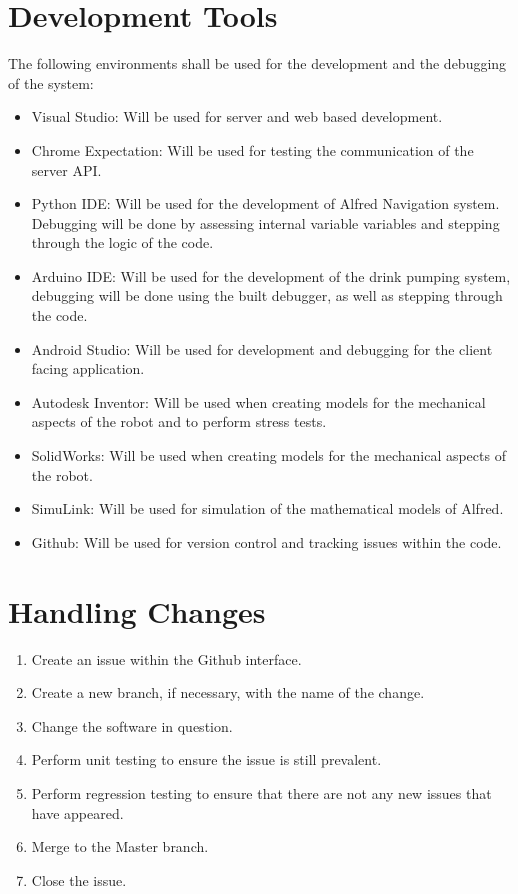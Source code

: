 \documentclass [10pt]{article}
\begin{document}
\section{Development Tools}
The following environments shall be used for the development and the debugging of the system:
	\begin{itemize}
		\item Visual Studio: Will be used for server and web based development.
		\item Chrome Expectation: Will be used for testing the communication of the server API.
		\item Python IDE: Will be used for the development of Alfred Navigation system. Debugging will be done by assessing internal variable variables and stepping through the logic of the code.
		\item Arduino IDE: Will be used for the development of the drink pumping system, debugging will be done using the built debugger, as well as stepping through the code.
		\item Android Studio: Will be used for development and debugging for the client facing application.
		\item Autodesk Inventor: Will be used when creating models for the mechanical aspects of the robot and to perform stress tests.
		\item SolidWorks: Will be used when creating models for the mechanical aspects of the robot.
		\item SimuLink: Will be used for simulation of the mathematical models of Alfred.
		\item Github: Will be used for version control and tracking issues within the code.
	\end{itemize}


\section{Handling Changes}

	\begin{enumerate}
		\item Create an issue within the Github interface.
		\item Create a new branch, if necessary, with the name of the change.
		\item Change the software in question.
		\item Perform unit testing to ensure the issue is still prevalent.
		\item Perform regression testing to ensure that there are not any new issues that have appeared.
		\item Merge to the Master branch.
		\item Close the issue.
	\end{enumerate}
\end{document}
